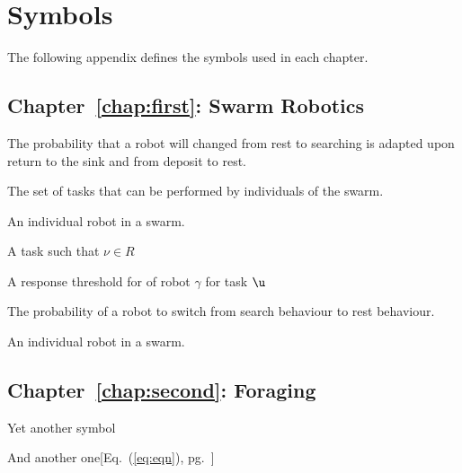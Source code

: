 
\chapter{Symbols}
\label{app:symbols}

The following appendix defines the symbols used in each chapter.  

\section{Chapter~\ref{chap:first}: Swarm Robotics}
\label{sec:symbols:swarmrobotics}

\begin{description}
\setlength{\itemsep}{-1mm}
	\item[\parbox{\namewidth}{$p1$}] The probability that a robot will changed from rest to searching is adapted upon return to the sink and from deposit to rest.
	\item[\parbox{\namewidth}{$R$}] The set of tasks that can be performed by individuals of the swarm.
	\item[\parbox{\namewidth}{$\gamma$}] An individual robot in a swarm.
	\item[\parbox{\namewidth}{$\nu$}] A task such that $\nu \in R$
	\item[\parbox{\namewidth}{$r_{\gamma,\nu}$}] A response threshold for of robot $\gamma$ for task $\u$
	\item[\parbox{\namewidth}{$z$}] The probability of a robot to switch from search behaviour to rest behaviour.
	\item[\parbox{\namewidth}{$\gamma$}] An individual robot in a swarm.
\end{description}


\section{Chapter~\ref{chap:second}: Foraging}
\label{sec:symbols:foraging}

\begin{description}
\setlength{\itemsep}{-1mm}
	\item[\parbox{\namewidth}{$\beta$}] Yet another symbol
	\item[\parbox{\namewidth}{$\eta(t)$}] And another one\hfill[Eq.~(\ref{eq:eqn}), pg.~\pageref{eq:eqn}]
\end{description}

